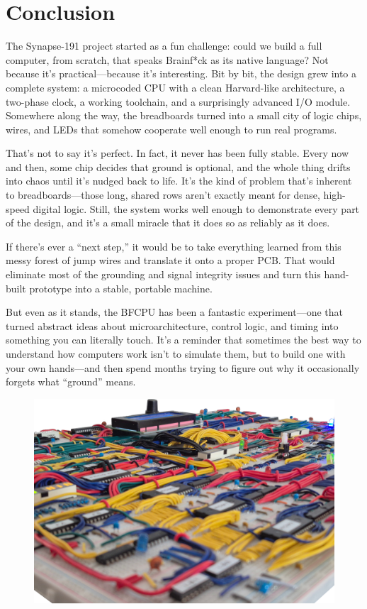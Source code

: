 \section{Conclusion} \label{sec:conclusion}
The Synapse-191 project started as a fun challenge: could we build a full computer, from scratch, that speaks Brainf*ck as its native language? Not because it’s practical—because it’s interesting. Bit by bit, the design grew into a complete system: a microcoded CPU with a clean Harvard-like architecture, a two-phase clock, a working toolchain, and a surprisingly advanced I/O module. Somewhere along the way, the breadboards turned into a small city of logic chips, wires, and LEDs that somehow cooperate well enough to run real programs.

That’s not to say it’s perfect. In fact, it never has been fully stable. Every now and then, some chip decides that ground is optional, and the whole thing drifts into chaos until it’s nudged back to life. It’s the kind of problem that’s inherent to breadboards—those long, shared rows aren’t exactly meant for dense, high-speed digital logic. Still, the system works well enough to demonstrate every part of the design, and it’s a small miracle that it does so as reliably as it does.

If there’s ever a “next step,” it would be to take everything learned from this messy forest of jump wires and translate it onto a proper PCB. That would eliminate most of the grounding and signal integrity issues and turn this hand-built prototype into a stable, portable machine.

But even as it stands, the BFCPU has been a fantastic experiment—one that turned abstract ideas about microarchitecture, control logic, and timing into something you can literally touch. It’s a reminder that sometimes the best way to understand how computers work isn’t to simulate them, but to build one with your own hands—and then spend months trying to figure out why it occasionally forgets what “ground” means.

\mbox{}
\vfill
\begin{figure}[H]
  \centering
  \includegraphics[width=\textwidth]{img/final_img}
\end{figure}


